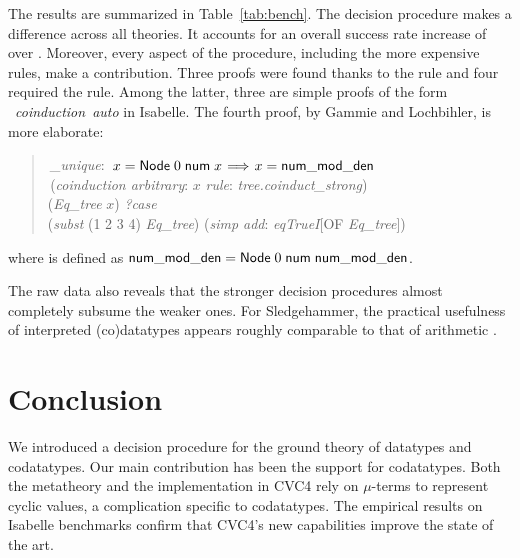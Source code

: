 The results are summarized in Table~\ref{tab:bench}. The decision procedure
makes a difference across all theories. It accounts for an overall success rate
increase of over . Moreover, every aspect of the procedure, including the
more expensive rules, make a contribution.
%
Three proofs were found thanks to
the  rule and four required the  rule. Among the latter,
three are simple proofs of the form
~\textit{coinduction}~\textit{auto} %
in Isabelle.
The fourth proof, by Gammie and Lochbihler, is more elaborate:
%
\begin{quote}
 \,\textit{\nummodden\_unique}: \,$x = \const{Node}\;0\;\const{num}\; x \vthinspace\Longrightarrow\vthinspace x = \const{\nummodden}$ \\
 \,(\textit{coinduction arbitrary}: $x$ \textit{rule}: \textit{tree.coinduct\_strong}) \\
\noindent\hbox{}\quad  {} (\textit{Eq\_tree} $x$)  \textit{?case} \\
\noindent\hbox{}\qquad  {} (\textit{subst} (1 2 3 4) \textit{Eq\_tree}) (\textit{simp add}: \textit{eqTrueI}[OF \textit{Eq\_tree}]) \\
\end{quote}
%
\noindent
where \const{\nummodden} is defined as $\textsf{num\hbox{\rm\_}mod\hbox{\rm\_}den} =
\textsf{Node}\;0\;\textsf{num}\;\textsf{num\hbox{\rm\_}mod\hbox{\rm\_}den}$.

The raw data also reveals that the
stronger decision procedures almost completely subsume the weaker ones. For
Sledgehammer, the practical usefulness of interpreted (co)datatypes appears
roughly comparable to that of arithmetic \cite{blanchette-et-al-2013-smt}.

\section{Conclusion}
\label{sec:conclusion}

We introduced a decision procedure for the ground theory of datatypes and
codatatypes. Our main
contribution has been the support for codatatypes. Both the metatheory and
the implementation in CVC4 rely on $\mu$-terms to represent cyclic values,
a complication specific to codatatypes.
The empirical results on Isabelle benchmarks
confirm that CVC4's new capabilities improve the state of the art.

